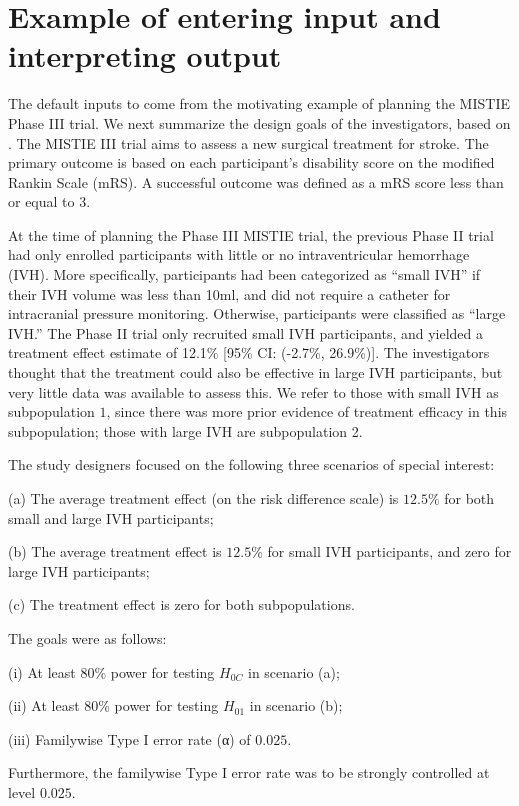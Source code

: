\documentclass[article]{jss}
\begin{document}
\section{Example of entering input and interpreting output}
\label{sec:example}

The default inputs to  come from the motivating example of planning the MISTIE Phase III trial. We next summarize the design goals of the investigators, based on \citep{Rosenblum2013AdaptMISTIE}. The MISTIE III trial aims to assess a new surgical treatment for stroke. The primary outcome is based on
 each participant's  disability score on the modified Rankin Scale (mRS). A successful outcome was defined as a mRS score less than or equal to 3. 

At the time of planning the Phase III MISTIE trial, the previous Phase II trial had only enrolled participants with little or no intraventricular hemorrhage (IVH). More specifically, participants had been categorized as ``small IVH'' if their IVH volume was less than 10ml, and did not require a catheter for intracranial pressure monitoring. Otherwise, participants were classified as ``large IVH.'' The Phase II trial only recruited small IVH participants, and yielded a treatment effect estimate of 12.1\% [95\% CI: (-2.7\%, 26.9\%)]. The investigators thought that the treatment could also be effective in large IVH participants, but very little data was available to assess this. We refer to those with small IVH as subpopulation $1$, since there was more prior evidence of treatment efficacy in this subpopulation; those with large IVH  are subpopulation 2.

The study designers focused on the following three scenarios of special interest:

\begin{description}
\item  (a) The average treatment effect (on the risk difference scale) is $12.5\%$ for both small and large IVH participants;
\item  (b) The average treatment effect is $12.5\%$ for small IVH participants, and zero for large IVH participants;
\item  (c) The treatment effect is zero for both subpopulations. 
\end{description}

The goals were as follows:

\begin{description}
\item  (i) At least 80\% power for testing $H_{0C}$ in scenario (a);
\item  (ii) At least 80\% power for testing $H_{01}$ in scenario (b);
\item  (iii) Familywise Type I error rate (α) of $0.025$.
\end{description}
Furthermore, the familywise Type I error rate was to be strongly controlled at level $0.025$.
\end{document}
